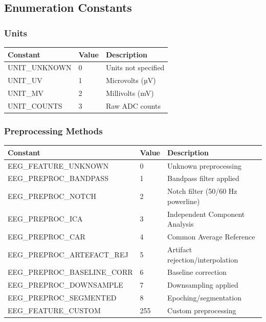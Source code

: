 \documentclass[11pt,a4paper]{article}
\begin{document}
\subsection{Enumeration Constants}

\subsubsection{Units}
\begin{longtable}{|>{\small}l|>{\small}l|>{\small}p{8cm}|}
\hline
\textbf{Constant} & \textbf{Value} & \textbf{Description} \\
\hline
UNIT\_UNKNOWN & 0 & Units not specified \\
UNIT\_UV & 1 & Microvolts (µV) \\
UNIT\_MV & 2 & Millivolts (mV) \\
UNIT\_COUNTS & 3 & Raw ADC counts \\
\hline
\end{longtable}

\subsubsection{Preprocessing Methods}
\begin{longtable}{|>{\small}l|>{\small}l|>{\small}p{7cm}|}
\hline
\textbf{Constant} & \textbf{Value} & \textbf{Description} \\
\hline
EEG\_FEATURE\_UNKNOWN & 0 & Unknown preprocessing \\
EEG\_PREPROC\_BANDPASS & 1 & Bandpass filter applied \\
EEG\_PREPROC\_NOTCH & 2 & Notch filter (50/60 Hz powerline) \\
EEG\_PREPROC\_ICA & 3 & Independent Component Analysis \\
EEG\_PREPROC\_CAR & 4 & Common Average Reference \\
EEG\_PREPROC\_ARTEFACT\_REJ & 5 & Artifact rejection/interpolation \\
EEG\_PREPROC\_BASELINE\_CORR & 6 & Baseline correction \\
EEG\_PREPROC\_DOWNSAMPLE & 7 & Downsampling applied \\
EEG\_PREPROC\_SEGMENTED & 8 & Epoching/segmentation \\
EEG\_FEATURE\_CUSTOM & 255 & Custom preprocessing \\
\hline
\end{longtable}
\end{document}
